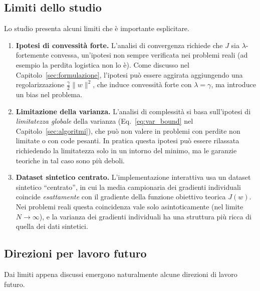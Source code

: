 \subsection{Limiti dello studio}

Lo studio presenta alcuni limiti che è importante esplicitare.

\begin{enumerate}
  \item \textbf{Ipotesi di convessità forte.} L'analisi di convergenza richiede
  che $J$ sia $\lambda$-fortemente convessa, un'ipotesi non sempre verificata
  nei problemi reali (ad esempio la perdita logistica non lo è). Come discusso
  nel Capitolo~\ref{sec:formulazione}, l'ipotesi può essere aggirata
  aggiungendo una regolarizzazione $\frac{\gamma}{2}\|w\|^2$, che induce
  convessità forte con $\lambda = \gamma$, ma introduce un bias nel problema.
  \item \textbf{Limitazione della varianza.} L'analisi di complessità si basa
  sull'ipotesi di \emph{limitatezza globale} della varianza
  (Eq.~\eqref{eq:var_bound} nel Capitolo~\ref{sec:algoritmi}), che può non
  valere in problemi con perdite non limitate o con code pesanti. In pratica
  questa ipotesi può essere rilassata richiedendo la limitatezza solo in un
  intorno del minimo, ma le garanzie teoriche in tal caso sono più deboli.
  \item \textbf{Dataset sintetico centrato.} L'implementazione interattiva usa
  un dataset sintetico ``centrato'', in cui la media campionaria dei gradienti
  individuali coincide \emph{esattamente} con il gradiente della funzione
  obiettivo teorica $J(w)$. Nei problemi reali questa coincidenza vale solo
  asintoticamente (nel limite $N \to \infty$), e la varianza dei gradienti
  individuali ha una struttura più ricca di quella dei dati sintetici.
\end{enumerate}

\subsection{Direzioni per lavoro futuro}

Dai limiti appena discussi emergono naturalmente alcune direzioni di lavoro
futuro.


